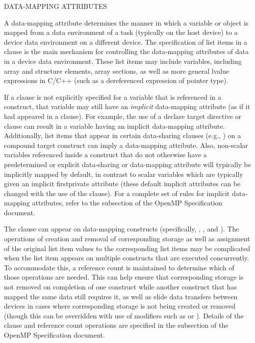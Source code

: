 \bigskip
DATA-MAPPING ATTRIBUTES

A data-mapping attribute determines the manner in which a variable or object is
mapped from a data environment of a task (typically on the host device) to a
device data environment on a different device. The specification of list items
in a  clause is the main mechanism for controlling the data-mapping
attributes of data in a device data environment. These list items may include
variables, including array and structure elements, array sections, as well as
more general lvalue expressions in C/C++ (such as a dereferenced expression of
pointer type).

If a  clause is not explicitly specified for a variable that is
referenced in a  construct, that variable may still have an
\emph{implicit} data-mapping attribute (as if it had appeared in a 
clause). For example, the use of a declare target directive or
 clause can result in a variable having an implicit
data-mapping attribute. Additionally, list items that appear in certain
data-sharing clauses (e.g., ) on a compound target construct
can imply a data-mapping attribute. Also, non-scalar variables referenced
inside a  construct that do not otherwise have a predetermined or
explicit data-sharing or data-mapping attribute will typically be implicitly
mapped by default, in contrast to scalar variables which are typically given
an implicit firstprivate attribute (these default implicit attributes can be
changed with the use of the  clause). For a complete set of
rules for implicit data-mapping attributes, refer to the
subsection of the OpenMP Specification document.

The  clause can appear on data-mapping constructs (specifically,
, ,  and
).  The operations of creation and removal of corresponding
storage as well as assignment of the original list item values to the
corresponding list items may be complicated when the list item appears on
multiple constructs that are executed concurrently. To accommodate this, a
reference count is maintained to determine which of those operations are
needed. This can help ensure that corresponding storage is not removed on
completion of one construct while another construct that has mapped the same
data still requires it, as well as elide data transfers between devices in
cases where corresponding storage is not being created or removed (though this
can be overridden with use of modifiers such as  or
). Details of the  clause and reference count
operations are specified in the  subsection of the
OpenMP Specification document.


